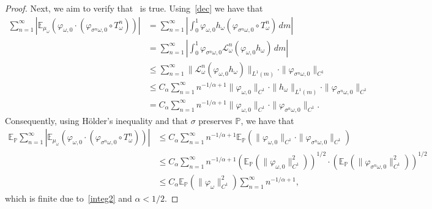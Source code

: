 \documentclass[12pt,reqno,a4paper]{article}
\begin{document}
\begin{proof}
		Next, we aim to verify that~\cite[Theorem 2.3 (i)]{K} is true. Using~\eqref{dec} we have that  
		\begin{equation}\label{eq:cond_1}
			\begin{split}
				\sum_{n=1}^\infty \left |\mathbb E_{\mu_\omega}(\varphi_{\omega, 0} \cdot (\varphi_{\sigma^n \omega, 0}\circ T_\omega^n))\right | &=\sum_{n=1}^\infty \left |\int_0^1 \varphi_{\omega, 0} h_\omega (\varphi_{\sigma^n \omega, 0}\circ T_\omega^n)\, dm \right | \\
				&=\sum_{n=1}^\infty \left |\int_0^1 \varphi_{\sigma^n \omega, 0}  \mathcal L_\omega^n( \varphi_{\omega, 0} h_\omega) \, dm \right |  \\
				&\le \sum_{n=1}^\infty \|\mathcal L_\omega^n (\varphi_{\omega, 0} h_\omega)\|_{L^1(m)} \cdot \|\varphi_{\sigma^n \omega, 0}\|_{C^1} \\
				&\le C_\alpha\sum_{n=1}^\infty n^{-1/\alpha+1}\|\varphi_{\omega, 0} \|_{C^1} \cdot \|h_\omega\|_{L^1(m)}\cdot \|\varphi_{\sigma^n \omega, 0}\|_{C^1} \\
				&= C_\alpha\sum_{n=1}^\infty n^{-1/\alpha+1}\|\varphi_{\omega, 0}\|_{C^1}\cdot \|\varphi_{\sigma^n \omega, 0}\|_{C^1}.
			\end{split}
		\end{equation}
		Consequently, using H\"{o}lder's inequality and that $\sigma$ preserves $\mathbb P$,  we have that 
		\[
		\begin{split}
			\mathbb E_{\mathbb P}\sum_{n=1}^\infty \left |\mathbb E_{\mu_\omega}(\varphi_{\omega, 0} \cdot (\varphi_{\sigma^n \omega, 0}\circ T_\omega^n))\right | &\le C_\alpha\sum_{n=1}^\infty n^{-1/\alpha+1}\mathbb E_{\mathbb P}(\|\varphi_{\omega, 0}\|_{C^1}\cdot \|\varphi_{\sigma^n \omega, 0}\|_{C^1}) \\
			&\le C_\alpha\sum_{n=1}^\infty n^{-1/\alpha+1} (\mathbb E_{\mathbb P}(\|\varphi_{\omega, 0}\|_{C^1}^2))^{1/2} \cdot (\mathbb E_{\mathbb P}(\|\varphi_{\sigma^n \omega, 0}\|_{C^1}^2))^{1/2} \\
			&\le C_\alpha\mathbb E_{\mathbb P}(\|\varphi_\omega\|_{C^1}^2)\sum_{n=1}^\infty n^{-1/\alpha+1} ,
		\end{split}
		\]
		which is finite due to~\eqref{integ2} and $\alpha<1/2$.
		

\end{proof}
\end{document}
